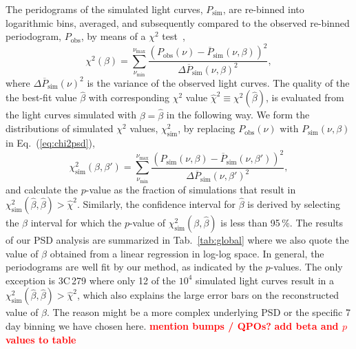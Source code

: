 \documentclass[twocolumn]{aastex62}
\newcommand{\todo}[1]{\textbf{\textcolor{red}{#1}}}
\begin{document}
The peridograms of the simulated light curves, ${P}_\mathrm{sim}$, are re-binned into logarithmic bins, averaged, and subsequently compared to the observed re-binned periodogram, $P_\mathrm{obs}$, by means of a $\chi^2$ test~\citep{2014MNRAS.445..437M},
\begin{equation}
    \chi^2(\beta) = \sum_{\nu_\mathrm{min}}^{\nu_\mathrm{max}}\frac{(P_\mathrm{obs}(\nu) - \overline{P}_\mathrm{sim}(\nu,\beta))^2}{\Delta\overline{P}_\mathrm{sim}(\nu,\beta)^2},\label{eq:chi2psd}
\end{equation}
where $\Delta\overline{P}_\mathrm{sim}(\nu)^2$ is the variance of the observed light curves. The quality of the the best-fit value $\hat\beta$ with corresponding $\chi^2$ value $\hat\chi^2\equiv\chi^2(\hat\beta)$, is evaluated from the light curves simulated with $\beta = \hat\beta$ in the following way. We form the distributions of simulated $\chi^2$ values, $\chi^2_\mathrm{sim}$, by replacing $P_\mathrm{obs}(\nu)$ with $P_\mathrm{sim}(\nu,\beta)$ in Eq.~(\ref{eq:chi2psd}),
\begin{equation}
    \chi^2_\mathrm{sim}(\beta,\beta') = \sum_{\nu_\mathrm{min}}^{\nu_\mathrm{max}}\frac{(P_\mathrm{sim}(\nu,\beta) - \overline{P}_\mathrm{sim}(\nu,\beta'))^2}{\Delta\overline{P}_\mathrm{sim}(\nu,\beta')^2},\label{eq:chi2psd_sim}
\end{equation}
and calculate the $p$-value as the  fraction of simulations that result in $\chi^2_\mathrm{sim}(\hat\beta,\hat\beta) > \hat\chi^2$.
Similarly, the confidence interval for $\hat\beta$ is derived by selecting the $\beta$ interval for which the $p$-value of $\chi^2_\mathrm{sim}(\beta,\hat\beta)$ is less than 95\,\%. 
The results of our PSD analysis are summarized in Tab.~\ref{tab:global} where we also quote the value of $\beta$ obtained from a linear regression in log-log space. 
In general, the periodograms are well fit by our method, as indicated by the $p$-values. The only exception is 3C\,279 where only 12 of the $10^4$ simulated light curves result in a $\chi^2_\mathrm{sim}(\hat\beta,\hat\beta) > \hat\chi^2$, which also explains the large error bars on the reconstructed value of $\beta$.
The reason might be a more complex underlying PSD or the specific 7 day binning we have chosen here. 
\todo{mention bumps / QPOs?}
\todo{add beta and $p$ values to table}
\end{document}
